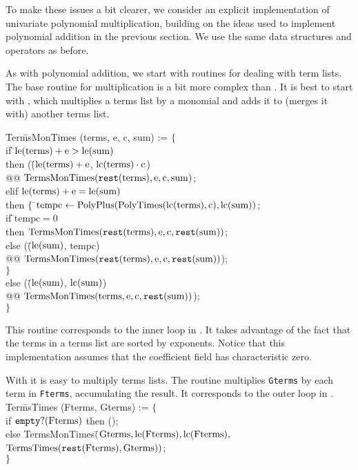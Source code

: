 To make these issues a bit clearer, we consider an explicit
implementation of univariate polynomial multiplication, building on the
ideas used to implement polynomial addition in the previous section.
We use the same data structures and operators as before. 

As with polynomial addition, we start with routines for dealing with
term lists.  The base routine for multiplication is a bit more complex
than .  It is best to start with ,
which multiplies a terms list by a monomial and adds it to (merges it
with) another terms list.

\begindsacode
Ter\=msMonTimes (terms, e, c, sum) := $\{$ \\
\>if \=$\mathop{\rm le}\nolimits(\mbox{terms}) + \mbox{e} > \mathop{\rm le}\nolimits(\mbox{sum})$ \\
\>\>then (\=($\mathop{\rm le}\nolimits(\mbox{terms}) + \mbox{e}$, $\mathop{\rm lc}\nolimits(\mbox{terms})\cdot\mbox{c}$)\\
\>\>\>@@ $\mbox{TermsMonTimes}(\mathop{\tt rest}\nolimits(\mbox{terms}), \mbox{e}, \mbox{c}, \mbox{sum})$;\\
\>elif $\mathop{\rm le}\nolimits(\mbox{terms}) + \mbox{e} = \mathop{\rm le}\nolimits(\mbox{sum})$ \\
\>\>then $\{$ \=$\mbox{tempc} \leftarrow
\mbox{PolyPlus}(\mbox{PolyTimes}(\mathop{\rm lc}\nolimits(\mbox{terms}), \mbox{c}), \mathop{\rm lc}\nolimits(\mbox{sum}))$; \\
\>\>\>if \=$\mbox{tempc} = 0$ \\
\>\>\>\>then $\mbox{TermsMonTimes}(\mathop{\tt rest}\nolimits(\mbox{terms}), \mbox{e}, \mbox{c}, \mathop{\tt rest}\nolimits(\mbox{sum}))$;\\
\>\>\>else (\=($\mathop{\rm le}\nolimits(\mbox{sum})$, tempc) \\
\>\>\>\>@@ $\mbox{TermsMonTimes}(\mathop{\tt rest}\nolimits(\mbox{terms}), \mbox{e}, \mbox{c}, \mathop{\tt rest}\nolimits(\mbox{sum}))$);\\
\>\>\>$\}$\\
\>else (\=($\mathop{\rm le}\nolimits(\mbox{sum})$, $\mathop{\rm lc}\nolimits(\mbox{sum})$)\\
\>\>@@ $\mbox{TermsMonTimes}(\mbox{terms}, \mbox{e}, \mbox{c}, \mathop{\tt rest}\nolimits(\mbox{sum}))$);\\
\>$\}$
\enddsacode

\noindent
This routine corresponds to the inner loop in .  It
takes advantage of the fact that the terms in a terms list are sorted
by exponents.  Notice that this implementation assumes that the
coefficient field has characteristic zero.

With  it is easy to multiply terms lists.  The
routine  multiplies {\tt Gterms} by each term in
{\tt Fterms}, accumulating the result.  It corresponds to the outer
loop in . 
\begindsacode
Ter\=msTimes (Fterms, Gterms) := $\{$ \\
\>if $\mathop{\tt empty?}\nolimits(\mbox{Fterms})$ then (); \\
\>else TermsMonTimes$($\=$\mbox{Gterms}, \mathop{\rm le}\nolimits(\mbox{Fterms}), \mathop{\rm lc}\nolimits(\mbox{Fterms}),$\\
\>\>$\mbox{TermsTimes}(\mathop{\tt rest}\nolimits(\mbox{Fterms}), \mbox{Gterms}))$;\\
\> $\}$
\enddsacode

